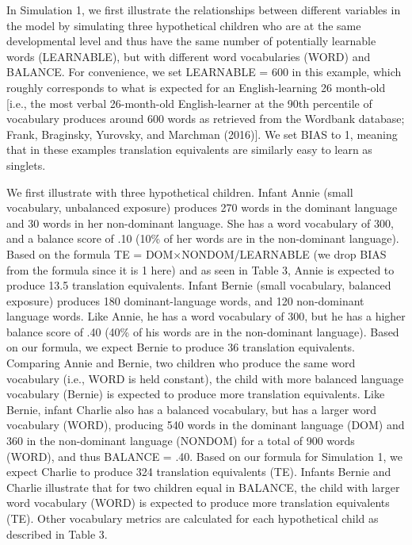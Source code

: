 \documentclass[
  english,
  ,man,floatsintext]{apa6}
\begin{document}
In Simulation 1, we first illustrate the relationships between different variables in the model by simulating three hypothetical children who are at the same developmental level and thus have the same number of potentially learnable words (LEARNABLE), but with different word vocabularies (WORD) and BALANCE. For convenience, we set LEARNABLE = 600 in this example, which roughly corresponds to what is expected for an English-learning 26 month-old {[}i.e., the most verbal 26-month-old English-learner at the 90th percentile of vocabulary produces around 600 words as retrieved from the Wordbank database; Frank, Braginsky, Yurovsky, and Marchman (2016){]}. We set BIAS to 1, meaning that in these examples translation equivalents are similarly easy to learn as singlets.

We first illustrate with three hypothetical children. Infant Annie (small vocabulary, unbalanced exposure) produces 270 words in the dominant language and 30 words in her non-dominant language. She has a word vocabulary of 300, and a balance score of .10 (10\% of her words are in the non-dominant language). Based on the formula TE = DOM×NONDOM/LEARNABLE (we drop BIAS from the formula since it is 1 here) and as seen in Table 3, Annie is expected to produce 13.5 translation equivalents. Infant Bernie (small vocabulary, balanced exposure) produces 180 dominant-language words, and 120 non-dominant language words. Like Annie, he has a word vocabulary of 300, but he has a higher balance score of .40 (40\% of his words are in the non-dominant language). Based on our formula, we expect Bernie to produce 36 translation equivalents. Comparing Annie and Bernie, two children who produce the same word vocabulary (i.e., WORD is held constant), the child with more balanced language vocabulary (Bernie) is expected to produce more translation equivalents. Like Bernie, infant Charlie also has a balanced vocabulary, but has a larger word vocabulary (WORD), producing 540 words in the dominant language (DOM) and 360 in the non-dominant language (NONDOM) for a total of 900 words (WORD), and thus BALANCE = .40. Based on our formula for Simulation 1, we expect Charlie to produce 324 translation equivalents (TE). Infants Bernie and Charlie illustrate that for two children equal in BALANCE, the child with larger word vocabulary (WORD) is expected to produce more translation equivalents (TE). Other vocabulary metrics are calculated for each hypothetical child as described in Table 3.
\end{document}
